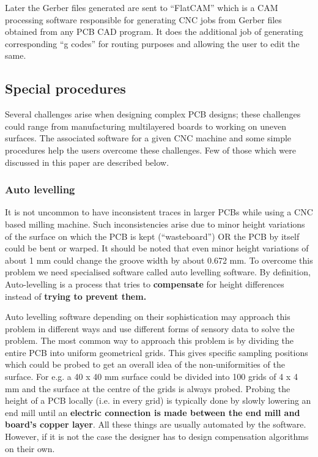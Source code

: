 Later the Gerber files generated are sent to “FlatCAM” which is a CAM processing software responsible for generating CNC jobs from Gerber files obtained from any PCB CAD program. It does the additional job of generating corresponding “g codes” for routing purposes and allowing the user to edit the same.


\subsection{Special procedures}

Several challenges arise when designing complex PCB designs; these challenges could range from manufacturing multilayered boards to working on uneven surfaces. The associated software for a given CNC machine and some simple procedures help the users overcome these challenges. Few of those which were discussed in this paper are described below.

\subsubsection*{Auto levelling}
It is not uncommon to have inconsistent traces in larger PCBs while using a CNC based milling machine. Such inconsistencies arise due to minor height variations of the surface on which the PCB is kept (“wasteboard”) OR the PCB by itself could be bent or warped. It should be noted that even minor height variations of about 1 mm could change the groove width by about 0.672 mm.  To overcome this problem we need specialised software called auto levelling software. By definition, Auto-levelling is a process that tries to \textbf{compensate} for height differences instead of \textbf{trying to prevent them.} \par

Auto levelling software depending on their sophistication may approach this problem in different ways and use different forms of sensory data to solve the problem. The most common way to approach this problem is by dividing the entire PCB into uniform geometrical grids. This gives specific sampling positions which could be probed to get an overall idea of the non-uniformities of the surface. For e.g. a 40 x 40 mm surface could be divided into 100 grids of 4 x 4 mm and the surface at the centre of the grids is always probed.  Probing the height of a PCB locally (i.e. in every grid) is typically done by slowly lowering an end mill until an \textbf{electric connection is made between the end mill and board’s copper layer}. All these things are usually automated by the software. However, if it is not the case the designer has to design compensation algorithms on their own. \par

